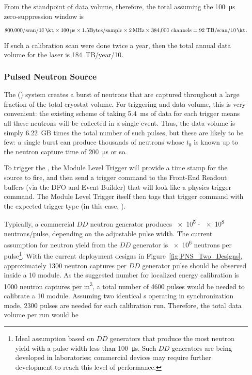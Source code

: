 From the standpoint of data volume, therefore, the total assuming the \SI{100}{\micro\s} zero-suppression window is

\begin{equation}
\num{800000}/{\rm scan}/\SI{10}{\kt} \times \SI{100}{\micro\s} \times \num{1.5}{\rm Bytes/sample}\times \SI{2}{\mega\hertz}\times \num{384000}~{\rm channels}   = \num{92}~{\rm TB/scan/\SI{10}{\kt}.}   
\end{equation}

If such a calibration scan were done twice a year, then the total annual data volume for the laser is \num{184}~TB/year/\SI{10}{\kt}.

\subsubsection{Pulsed Neutron Source}

The  () system creates a burst of neutrons that
are captured throughout a large fraction of the total cryostat volume. For triggering and data volume, this is very convenient: the existing scheme of taking \SI{5.4}{\milli\s} of data for each trigger means all these neutrons will be collected in a single  event. Thus, the data volume is simply \num{6.22}~GB times the total number of such pulses, but these are likely to be few: a single burst can produce thousands of neutrons whose $t_0$ is known up to the neutron capture time of \SI{200}{\micro\s} or so.

To trigger the , the Module Level Trigger will provide a time stamp for the source to fire, and then send a trigger command to the Front-End Readout buffers (via the DFO and Event Builder) that will look like a physics trigger command.  The Module Level Trigger itself then tags that trigger command with the expected trigger type (in this case, ).

Typically, a commercial $DD$ neutron generator produces \num{e5} - \num{e8} neutrons/pulse, depending on the adjustable pulse width. The current assumption for neutron yield from the $DD$ generator is \num{e6} neutrons per pulse\footnote{Ideal assumption based on $DD$ generators that produce the most neutron yield with a pulse width less than \SI{100}{\micro\s}. Such $DD$ generators are being developed in laboratories; commercial devices may require further development to reach this level of performance.}. With the current deployment designs in Figure~\ref{fig:PNS_Two_Designs}, approximately \num{1300} neutron captures per $DD$ generator pulse should be observed inside a \SI{10}{\kt} module. As the suggested number for localized energy calibration is \num{1000} neutron captures per \si{\cubic\m}, a total number of \num{4600} pulses would be needed to calibrate a \SI{10}{\kt} module. Assuming two identical s operating in synchronization mode, \num{2300} pulses are needed for each calibration run. Therefore, the total data volume per run would be

